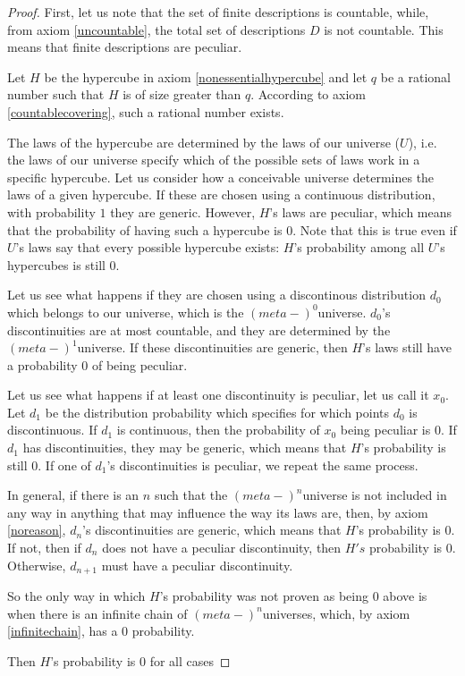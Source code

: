 \documentclass[a4paper
,draft
]{article}
\begin{document}
\begin{proof}

First, let us note that the set of finite descriptions is countable, while, from axiom \ref{uncountable}, the total set of descriptions $D$ is not countable. This means that finite descriptions are peculiar.

Let $H$ be the hypercube in axiom \ref{nonessentialhypercube} and let $q$ be a rational number such that $H$ is of size greater than $q$. According to axiom \ref{countablecovering}, such a rational number exists.

The laws of the hypercube are determined by the laws of our universe ($U$), i.e. the laws of our universe specify which of the possible sets of laws work in a specific hypercube. Let us consider how a conceivable universe determines the laws of a given hypercube. If these are chosen using a continuous distribution, with probability $1$ they are generic. However, $H$'s laws are peculiar, which means that the probability of having such a hypercube is $0$. Note that this is true even if $U$'s laws say that every possible hypercube exists: $H$'s probability among all $U$'s hypercubes is still $0$.

Let us see what happens if they are chosen using a discontinous distribution $d_0$ which belongs to our universe, which is the $(meta-)^0$universe. $d_0$'s discontinuities are at most countable, and they are determined by the $(meta-)^1$universe. If these discontinuities are generic, then $H$'s laws still have a probability $0$ of being peculiar.

Let us see what happens if at least one discontinuity is peculiar, let us call it $x_0$. Let $d_1$ be the distribution probability which specifies for which points $d_0$ is discontinuous. If $d_1$ is continuous, then the probability of $x_0$ being peculiar is $0$. If $d_1$ has discontinuities, they may be generic, which means that $H$'s probability is still $0$. If one of $d_1$'s discontinuities is peculiar, we repeat the same process.

In general, if there is an $n$ such that the $(meta-)^{n}$universe is not included in any way in anything that may influence the way its laws are, then, by axiom \ref{noreason}, $d_n$'s discontinuities are generic, which means that $H$'s probability is $0$. If not, then if $d_n$ does not have a peculiar discontinuity, then $H's$ probability is $0$. Otherwise, $d_{n+1}$ must have a peculiar discontinuity.

So the only way in which $H$'s probability was not proven as being $0$ above is when there is an infinite chain of $(meta-)^{n}$universes, which, by axiom \ref{infinitechain}, has a $0$ probability.

Then $H$'s probability is $0$ for all cases
\end{proof}
\end{document}
